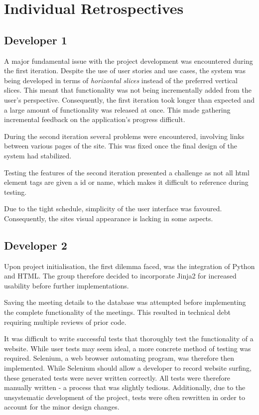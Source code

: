 \documentclass[11pt, a4paper]{article}
\begin{document}
	\section{Individual Retrospectives}
	\subsection{Developer 1}
	A major fundamental issue with the project development was encountered during the first iteration. Despite the use of user stories and use cases, the system was being developed in terms of \textit{horizontal slices} instead of the preferred vertical slices. This meant that functionality was not being incrementally added from the user's perspective. Consequently, the first iteration took longer than expected and a large amount of functionality was released at once. This made gathering incremental feedback on the application's progress difficult.
	
	During the second iteration several problems were encountered, involving links between various pages of the site. This was fixed once the final design of the system had stabilized.
	
	Testing the features of the second iteration presented a challenge as not all html element tags are given a id or name, which makes it difficult to reference during testing.
	
	Due to the tight schedule, simplicity of the user interface was favoured. Consequently, the sites visual appearance is lacking in some aspects.
	\subsection{Developer 2}
	Upon project initialisation, the first dilemma faced, was the integration of Python and HTML. The group therefore decided to incorporate Jinja2 for increased usability before further implementations. 
	
	Saving the meeting details to the database was attempted before implementing the complete functionality of the meetings. This resulted in technical debt requiring multiple reviews of prior code. 
	
	It was difficult to write successful tests that thoroughly test the functionality of a website. While user tests may seem ideal, a more concrete method of testing was required. Selenium, a web browser automating program, was therefore then implemented. While Selenium should allow a developer to record website surfing, these generated tests were never written correctly. All tests were therefore manually written - a process that was slightly tedious. 
	Additionally, due to the unsystematic development of the project, tests were often rewritten in order to account for the minor design changes. 
	
\end{document}
